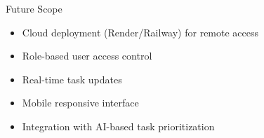 \documentclass{beamer}
\begin{document}
\begin{frame}{Future Scope}
\begin{itemize}
    \item Cloud deployment (Render/Railway) for remote access
    \item Role-based user access control
    \item Real-time task updates
    \item Mobile responsive interface
    \item Integration with AI-based task prioritization
\end{itemize}
\end{frame}
\end{document}
